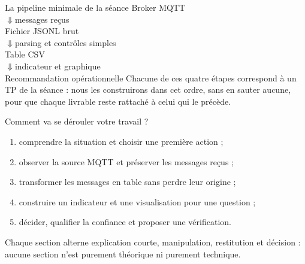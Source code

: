 \documentclass[aspectratio=169]{beamer}
\begin{document}
\begin{frame}{La pipeline minimale de la séance}
  \centering
  \Large Broker MQTT\\[2mm]
  $\Downarrow$\quad messages reçus\\[2mm]
  Fichier JSONL brut\\[2mm]
  $\Downarrow$\quad parsing et contrôles simples\\[2mm]
  Table CSV\\[2mm]
  $\Downarrow$\quad indicateur et graphique\\[2mm]
  Recommandation opérationnelle
  \vfill
  \normalsize Chacune de ces quatre étapes correspond à un TP de la séance : nous les construirons dans cet ordre, sans en sauter aucune, pour que chaque livrable reste rattaché à celui qui le précède.
\end{frame}

\begin{frame}{Comment va se dérouler votre travail ?}
  \begin{enumerate}
    \item comprendre la situation et choisir une première action ;
    \item observer la source MQTT et préserver les messages reçus ;
    \item transformer les messages en table sans perdre leur origine ;
    \item construire un indicateur et une visualisation pour une question ;
    \item décider, qualifier la confiance et proposer une vérification.
  \end{enumerate}
  \vfill
  \alert{Chaque section alterne explication courte, manipulation, restitution et décision : aucune section n'est purement théorique ni purement technique.}
\end{frame}
\end{document}
